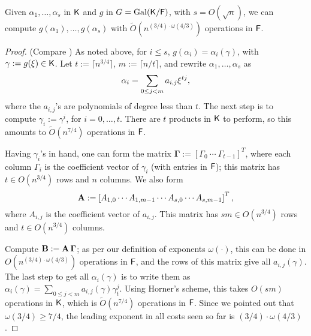 \begin{lemma}
  \label{lem:modcom}
  Given $\alpha_1,\dots,\alpha_s$ in ${\mathsf{K}}$ and $g$ in $G =
  \mathrm{Gal}({\mathsf{K}}/{\mathsf{F}})$, with $s = O(\sqrt{n})$, we can compute
  $g(\alpha_1),\dots,g(\alpha_s)$ with $\tilde
  O(n^{(3/4)\cdot\omega(4/3)})$ operations in ${\mathsf{F}}$.
\end{lemma}
\begin{proof}
(Compare \cite[Lemma~3]{KalSho98}) As noted above, for $i\le s$,
  $g(\alpha_i) = \alpha_i(\gamma)$, with $\gamma := g(\xi) \in {\mathsf{K}}$.
  Let $t := \lceil n^{3/4} \rceil$, $m:=\lceil n/t\rceil$, and rewrite $\alpha_1 , \ldots , \alpha_s$ as 
$$\alpha_i = \sum_{0 \leq j < m} a_{i,j}\xi^{tj},$$ where the
  $a_{i,j}$'s are polynomials of degree less than $t$. The next step
  is to compute $\gamma_i := \gamma^i$, for $i = 0 , \ldots , t$.
  There are $t$ products in ${\mathsf{K}}$ to perform, so this amounts to
  $\tilde{O}(n^{7/4})$ operations in ${\mathsf{F}}$.

  Having $\gamma_i$'s in hand, one can form the matrix
  $\boldsymbol{\Gamma} := \left[ \Gamma_0 ~ \cdots ~ \Gamma_{t-1}
    \right]^T$, where each column $\Gamma_i$ is the coefficient vector
  of $\gamma_i$ (with entries in ${\mathsf{F}}$); this matrix has $t \in
  O(n^{3/4})$ rows and $n$ columns. We also form
  $$\mat A := \left[{A}_{1,0} \cdots {A}_{1,m-1} \cdots
    {A}_{s,0} \cdots {A}_{s,m-1}\right]^T,$$ where
  ${A}_{i,j}$ is the coefficient vector of $a_{i,j}$. This matrix 
  has $s m \in O(n^{3/4})$ rows and $t \in O(n^{3/4})$ columns.

  Compute $\mat B:=\mat A\, \boldsymbol{\Gamma}$; as per our
  definition of exponents $\omega(\cdot )$, this can be done in
  $O(n^{(3/4)\cdot \omega(4/3)})$ operations in ${\mathsf{F}}$, and the rows of this matrix
  give all $a_{i,j}(\gamma)$.  The last step to get all
  $\alpha_i(\gamma)$ is to write them as $\alpha_i(\gamma) = \sum_{0
    \leq j < m} a_{i,j}(\gamma) \gamma_t^{j}.$ Using Horner's scheme,
  this takes $O(sm)$ operations in ${\mathsf{K}}$, which is $\tilde{O}(n^{7/4})$
  operations in ${\mathsf{F}}$. Since we pointed out that $\omega(3/4) \ge 7/4$,
  the leading exponent in all costs seen so far is
  $(3/4)\cdot\omega(4/3)$.
\end{proof}


